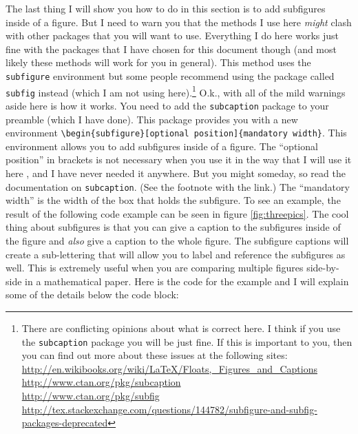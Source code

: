 \documentclass{article}
\begin{document}
The last thing I will show you how to do in this section is to add subfigures inside of a figure.  But I need to warn you that the methods I use here \textit{might} clash with other packages that you will want to use.  Everything I do here works just fine with the packages that I have chosen for this document though (and most likely these methods will work for you in general).  This method uses the \verb|subfigure| environment but some people recommend using the package called \verb|subfig| instead (which I am not using here).\footnote{There are conflicting opinions about what is correct here.  I think if you use the \texttt{subcaption} package you will be just fine.  If this is important to you, then you can find out more about these issues at the following sites:\\
\url{http://en.wikibooks.org/wiki/LaTeX/Floats,_Figures_and_Captions}\\
\url{http://www.ctan.org/pkg/subcaption}\\
\url{http://www.ctan.org/pkg/subfig}\\
\url{http://tex.stackexchange.com/questions/144782/subfigure-and-subfig-packages-deprecated}}
O.k., with all of the mild warnings aside here is how it works.  You need to add the \verb|subcaption| package to your preamble (which I have done).  This package provides you with a new environment \verb|\begin{subfigure}[optional position]{mandatory width}|.  This environment allows you to add subfigures inside of a figure.  The ``optional position'' in brackets is not necessary when you use it in the way that I will use it here , and I have never needed it anywhere.  But you might someday, so read the documentation on \texttt{subcaption}.  (See the footnote with the link.)  The ``mandatory width'' is the width of the box that holds the subfigure.   To see an example, the result of the following code example can be seen in figure \ref{fig:threepics}.  The cool thing about subfigures is that you can give a caption to the subfigures inside of the figure and \emph{also} give a caption to the whole figure.  The subfigure captions will create a sub-lettering that will allow you to label and reference the subfigures as well.  This is extremely useful when you are comparing multiple figures side-by-side in a mathematical paper.  Here is the code for the example and I will explain some of the details below the code block:
\end{document}
